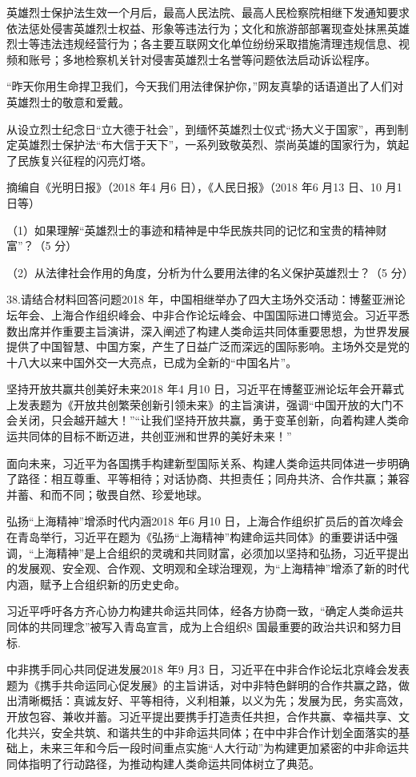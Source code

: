 \documentclass[UTF8,11pt]{ctexart}
\begin{document}
英雄烈士保护法生效一个月后，最高人民法院、最高人民检察院相继下发通知要求依法惩处侵害英雄烈士权益、形象等违法行为；文化和旅游部部署现查处抹黑英雄烈士等违法违规经营行为；各主要互联网文化单位纷纷采取措施清理违规信息、视频和账号；多地检察机关针对侵害英雄烈士名誉等问题依法启动诉讼程序。

“昨天你用生命捍卫我们，今天我们用法律保护你，”网友真挚的话语道出了人们对英雄烈士的敬意和爱戴。

从设立烈士纪念日“立大德于社会”，到缅怀英雄烈士仪式“扬大义于国家”，再到制定英雄烈士保护法“布大信于天下”，一系列致敬英烈、崇尚英雄的国家行为，筑起了民族复兴征程的闪亮灯塔。

摘编自《光明日报》（2018 年4 月6 日），《人民日报》（2018 年6 月13 日、10 月1 日等）

（1）如果理解“英雄烈士的事迹和精神是中华民族共同的记忆和宝贵的精神财富”？（5 分）


（2）从法律社会作用的角度，分析为什么要用法律的名义保护英雄烈士？（5 分）


38.请结合材料回答问题2018 年，中国相继举办了四大主场外交活动：博鳌亚洲论坛年会、上海合作组织峰会、中非合作论坛峰会、中国国际进口博览会。习近平悉数出席并作重要主旨演讲，深入阐述了构建人类命运共同体重要思想，为世界发展提供了中国智慧、中国方案，产生了日益广泛而深远的国际影响。主场外交是党的十八大以来中国外交一大亮点，已成为全新的“中国名片”。


坚持开放共赢共创美好未来2018 年4 月10 日，习近平在博鳌亚洲论坛年会开幕式上发表题为《开放共创繁荣创新引领未来》的主旨演讲，强调“中国开放的大门不会关闭，只会越开越大！”“让我们坚持开放共赢，勇于变革创新，向着构建人类命运共同体的目标不断迈进，共创亚洲和世界的美好未来！”


面向未来，习近平为各国携手构建新型国际关系、构建人类命运共同体进一步明确了路径：相互尊重、平等相待；对话协商、共担责任；同舟共济、合作共赢；兼容并蓄、和而不同；敬畏自然、珍爱地球。


弘扬“上海精神”增添时代内涵2018 年6 月10 日，上海合作组织扩员后的首次峰会在青岛举行，习近平在题为《弘扬“上海精神”构建命运共同体》的重要讲话中强调，“上海精神”是上合组织的灵魂和共同财富，必须加以坚持和弘扬，习近平提出的发展观、安全观、合作观、文明观和全球治理观，为“上海精神”增添了新的时代内涵，赋予上合组织新的历史史命。

习近平呼吁各方齐心协力构建共命运共同体，经各方协商一致，“确定人类命运共同体的共同理念”被写入青岛宣言，成为上合组织8 国最重要的政治共识和努力目标.

中非携手同心共同促进发展2018 年9 月3 日，习近平在中非合作论坛北京峰会发表题为《携手共命运同心促发展》的主旨讲话，对中非特色鲜明的合作共赢之路，做出清晰概括：真诚友好、平等相待，义利相兼，以义为先；发展为民，务实高效，开放包容、兼收并蓄。习近平提出要携手打造责任共担，合作共赢、幸福共享、文化共兴，安全共筑、和谐共生的中非命运共同体；在中中非合作计划全面落实的基础上，未来三年和今后一段时间重点实施“人大行动”为构建更加紧密的中非命运共同体指明了行动路径，为推动构建人类命运共同体树立了典范。
\end{document}
